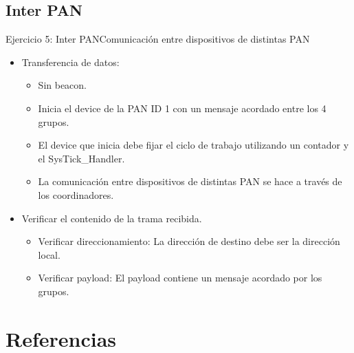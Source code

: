 \documentclass[aspectratio=169,handout]{beamer}
\begin{document}
\subsection[Inter PAN]{Inter PAN}
\begin{frame}[t]{Ejercicio 5: Inter PAN}{Comunicación entre dispositivos de distintas PAN}
    \begin{itemize}
        \item Transferencia de datos:
        \vspace{5px}
            \begin{itemize}
            \item Sin beacon.
            \vspace{5px}
            \item Inicia el device de la PAN ID 1 con un mensaje acordado entre los 4 grupos.
            \vspace{5px}   
            \item El device que inicia debe fijar el ciclo de trabajo utilizando un contador y el SysTick{\_}Handler.
            \vspace{5px}
            \item La comunicación entre dispositivos de distintas PAN se hace a través de los coordinadores.
	        \vspace{10px}            
            \end{itemize}
        \item Verificar el contenido de la trama recibida.
			\vspace{5px}
            \begin{itemize}
            \item Verificar direccionamiento: La dirección de destino debe ser la dirección local.
            \vspace{5px}
            \item Verificar payload: El payload contiene un mensaje acordado por los grupos.
            \vspace{5px}
            \end{itemize}
        \vspace{5px}
    \end{itemize}   
\end{frame}

\section{Referencias}
\end{document}
